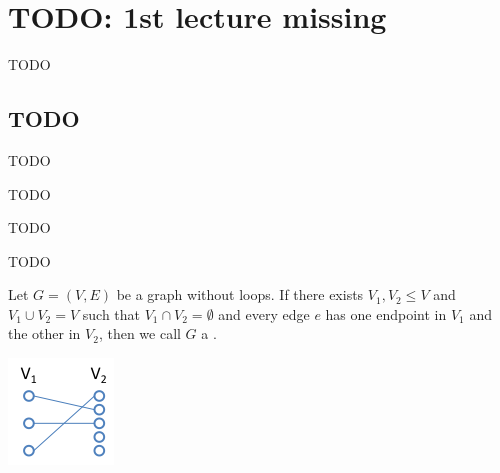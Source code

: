 \chapter{TODO: 1st lecture missing}

\begin{descr}
    TODO
\end{descr}

\section{TODO}
\begin{definition}
    TODO
\end{definition}
\begin{definition}
    TODO
\end{definition}
\begin{definition}
    TODO
\end{definition}
\begin{lemma}
    TODO
\end{lemma}

\begin{definition}
    Let $G = (V,E)$ be a graph without loops. If there exists $V_{1}, V_{2} \leq V$ and $V_{1} \cup V_{2} = V$
    such that $V_{1} \cap V_{2} = \emptyset$ and every edge $e$ has one endpoint in $V{_1}$ and the other in $V_{2}$,
    then we call $G$ a .
\end{definition}

\begin{example*}
    \includegraphics{diagrams/def14_example1.png}
\end{example*}

